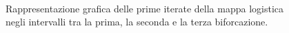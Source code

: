 \documentclass[13pt]{article}
\begin{document}
%
\begin{figure}[!htbp]
	\caption{Rappresentazione grafica delle prime iterate della mappa logistica negli intervalli tra la prima, la seconda e la terza biforcazione.}

	\\
 	\\
 	\\
	
\end{figure}
\end{document}
